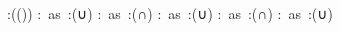 \begin{multicols}{2}
\begin{mktsEnNotes}{\mktsEnStyleMarkNotes{}\mktsEnMarkAfter{}}
\end{mktsEnNotes}

\begingroup\mktsObeyAllLines{}
\cjkgGlue{}:(\cjkgGlue{}\cjkgGlue{}(\cjkgGlue{}\cjkgGlue{})\cjkgGlue{})
\cjkgGlue{}:\cjkgGlue{} as \cjkgGlue{}:({\mktsRsgFb{}∪}\cjkgGlue{})\cjkgGlue{} 
\cjkgGlue{}:\cjkgGlue{} as \cjkgGlue{}:({\mktsRsgFb{}∩}\cjkgGlue{})\cjkgGlue{} 
\cjkgGlue{}:\cjkgGlue{}\cjkgGlue{} as \cjkgGlue{}:({\mktsRsgFb{}∪}\cjkgGlue{})\cjkgGlue{} 
\cjkgGlue{}:\cjkgGlue{}\cjkgGlue{} as \cjkgGlue{}:({\mktsRsgFb{}∩}\cjkgGlue{})\cjkgGlue{} 
\cjkgGlue{}:\cjkgGlue{}\cjkgGlue{} as \cjkgGlue{}:({\mktsRsgFb{}∪}\cjkgGlue{})\cjkgGlue{} 
\endgroup{}\end{multicols}




